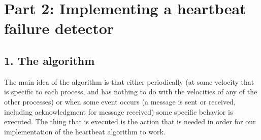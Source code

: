 \documentclass[12pt]{article}
\theoremstyle{plain}
\begin{document}
\section*{\textbf{Part 2: Implementing a heartbeat failure detector}}

\subsection*{1. The algorithm} %
\label{sub:The algorithm}

The main idea of the algorithm is that either periodically (at some velocity
that is specific to each process, and has nothing to do with the velocities
of any of the other processes) or when some event occurs (a message is sent or
received, including acknowledgment for message received) some specific behavior 
is executed. The thing that is executed is the action that is needed in order
for our implementation of the heartbeat algorithm to work. 
\end{document}
